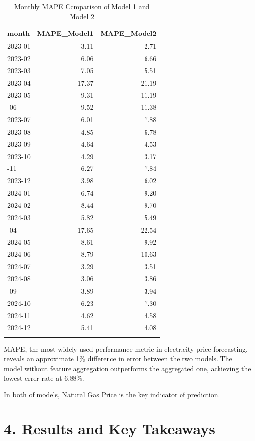 \documentclass[
]{article}
\begin{document}
\begin{longtable}[t]{lrr}
\caption{Monthly MAPE Comparison of Model 1 and Model 2}\\
\toprule
month & MAPE\_Model1 & MAPE\_Model2\\
\midrule
2023-01 & 3.11 & 2.71\\
2023-02 & 6.06 & 6.66\\
2023-03 & 7.05 & 5.51\\
2023-04 & 17.37 & 21.19\\
2023-05 & 9.31 & 11.19\\
\addlinespace
2023-06 & 9.52 & 11.38\\
2023-07 & 6.01 & 7.88\\
2023-08 & 4.85 & 6.78\\
2023-09 & 4.64 & 4.53\\
2023-10 & 4.29 & 3.17\\
\addlinespace
2023-11 & 6.27 & 7.84\\
2023-12 & 3.98 & 6.02\\
2024-01 & 6.74 & 9.20\\
2024-02 & 8.44 & 9.70\\
2024-03 & 5.82 & 5.49\\
\addlinespace
2024-04 & 17.65 & 22.54\\
2024-05 & 8.61 & 9.92\\
2024-06 & 8.79 & 10.63\\
2024-07 & 3.29 & 3.51\\
2024-08 & 3.06 & 3.86\\
\addlinespace
2024-09 & 3.89 & 3.94\\
2024-10 & 6.23 & 7.30\\
2024-11 & 4.62 & 4.58\\
2024-12 & 5.41 & 4.08\\
\cellcolor[HTML]{f2f2f2}{\textbf{Average}} & \cellcolor[HTML]{f2f2f2}{\textbf{6.88}} & \cellcolor[HTML]{f2f2f2}{\textbf{7.90}}\\
\bottomrule
\end{longtable}

MAPE, the most widely used performance metric in electricity price
forecasting, reveals an approximate 1\% difference in error between the
two models. The model without feature aggregation outperforms the
aggregated one, achieving the lowest error rate at 6.88\%.

In both of models, Natural Gas Price is the key indicator of prediction.

\section{4. Results and Key Takeaways}\label{results-and-key-takeaways}
\end{document}
